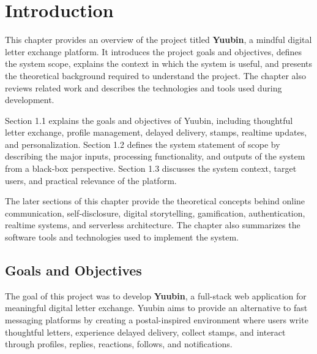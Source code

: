 ﻿\documentclass[12pt,a4paper]{report}
\begin{document}
\newpage

\clearpage
{}
\setcounter{page}{1}

\chapter{Introduction}

This chapter provides an overview of the project titled \textbf{Yuubin}, a mindful digital letter exchange platform. It introduces the project goals and objectives, defines the system scope, explains the context in which the system is useful, and presents the theoretical background required to understand the project. The chapter also reviews related work and describes the technologies and tools used during development.

Section 1.1 explains the goals and objectives of Yuubin, including thoughtful letter exchange, profile management, delayed delivery, stamps, realtime updates, and personalization. Section 1.2 defines the system statement of scope by describing the major inputs, processing functionality, and outputs of the system from a black-box perspective. Section 1.3 discusses the system context, target users, and practical relevance of the platform.

The later sections of this chapter provide the theoretical concepts behind online communication, self-disclosure, digital storytelling, gamification, authentication, realtime systems, and serverless architecture. The chapter also summarizes the software tools and technologies used to implement the system.

\newpage

\section{Goals and Objectives}

The goal of this project was to develop \textbf{Yuubin}, a full-stack web application for meaningful digital letter exchange. Yuubin aims to provide an alternative to fast messaging platforms by creating a postal-inspired environment where users write thoughtful letters, experience delayed delivery, collect stamps, and interact through profiles, replies, reactions, follows, and notifications.
\end{document}
